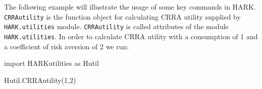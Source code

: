 \documentclass[10pt,twocolumn]{article}
\newenvironment{Shaded}{\begin{snugshade}}{\end{snugshade}}
\newcommand{\DecValTok}[1]{\textcolor[rgb]{0.00,0.00,0.81}{#1}}
\newcommand{\ImportTok}[1]{#1}
\newcommand{\NormalTok}[1]{#1}
\begin{document}

The following example will illustrate the usage of some key commands in HARK.  \texttt{CRRAutility} is the function object for calculating CRRA utility supplied by \texttt{HARK.utilities} module. \texttt{CRRAutility} is called attributes of the module \texttt{HARK.utilities}. In order to calculate CRRA utility with a consumption of 1 and a coefficient of risk aversion of 2 we run:

\begin{Shaded}
\begin{Highlighting}[]
\ImportTok{import}\NormalTok{ HARKutilities }\ImportTok{as}\NormalTok{ Hutil}

\NormalTok{Hutil.CRRAutility(}\DecValTok{1}\NormalTok{,}\DecValTok{2}\NormalTok{)  }
\end{Highlighting}
\end{Shaded}
\end{document}
